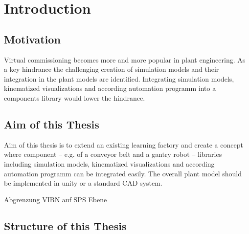 \chapter{Introduction}

\section{Motivation}
Virtual commissioning becomes more and more popular in plant engineering. As a key hindrance the challenging creation of simulation models and their integration in the plant models are identified. Integrating simulation models, kinematized visualizations and according automation programm into a components library would lower the hindrance.

\section{Aim of this Thesis}
Aim of this thesis is to extend an existing learning factory and create a concept where component -- e.g. of a conveyor belt and a gantry robot -- libraries including simulation models, kinematized visualizations and according automation programm can be integrated easily. The overall plant model should be implemented in unity or a standard CAD system.

Abgrenzung VIBN auf SPS Ebene

\section{Structure of this Thesis}